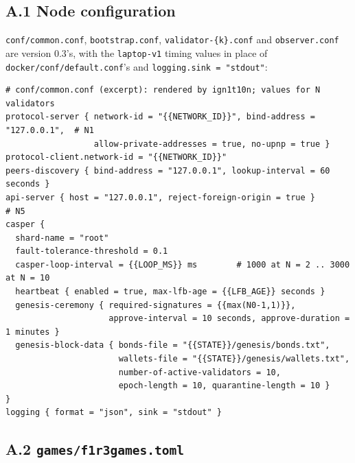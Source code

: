 \documentclass[11pt]{article}
\theoremstyle{definition}
\theoremstyle{remark}
\newcommand{\code}[1]{\texttt{#1}}
\begin{document}
\subsection*{A.1 Node configuration}

\code{conf/common.conf}, \code{bootstrap.conf}, \code{validator-\{k\}.conf} and
\code{observer.conf} are version 0.3's, with the \code{laptop-v1} timing values in
place of \code{docker/conf/default.conf}'s and \code{logging.sink = "stdout"}:

\begin{lstlisting}[language=Hocon]
# conf/common.conf (excerpt): rendered by ign1t10n; values for N validators
protocol-server { network-id = "{{NETWORK_ID}}", bind-address = "127.0.0.1",  # N1
                  allow-private-addresses = true, no-upnp = true }
protocol-client.network-id = "{{NETWORK_ID}}"
peers-discovery { bind-address = "127.0.0.1", lookup-interval = 60 seconds }
api-server { host = "127.0.0.1", reject-foreign-origin = true }                # N5
casper {
  shard-name = "root"
  fault-tolerance-threshold = 0.1
  casper-loop-interval = {{LOOP_MS}} ms        # 1000 at N = 2 .. 3000 at N = 10
  heartbeat { enabled = true, max-lfb-age = {{LFB_AGE}} seconds }
  genesis-ceremony { required-signatures = {{max(N0-1,1)}},
                     approve-interval = 10 seconds, approve-duration = 1 minutes }
  genesis-block-data { bonds-file = "{{STATE}}/genesis/bonds.txt",
                       wallets-file = "{{STATE}}/genesis/wallets.txt",
                       number-of-active-validators = 10,
                       epoch-length = 10, quarantine-length = 10 }
}
logging { format = "json", sink = "stdout" }
\end{lstlisting}

\subsection*{A.2 \code{games/f1r3games.toml}}
\end{document}

